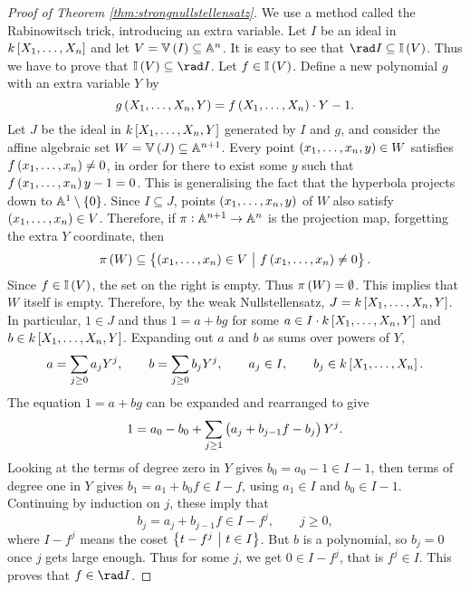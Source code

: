 \begin{proof}[Proof of Theorem \ref{thm:strongnullstellensatz}]
We use a method called the Rabinowitsch trick, introducing an extra variable. Let $ I $ be an ideal in $ k\sbr{X_1, \dots, X_n} $ and let $ V = \VV\br{I} \subseteq \AA^n $. It is easy to see that $ \rad I \subseteq \II\br{V} $. Thus we have to prove that $ \II\br{V} \subseteq \rad I $. Let $ f \in \II\br{V} $. Define a new polynomial $ g $ with an extra variable $ Y $ by
$$ g\br{X_1, \dots, X_n, Y} = f\br{X_1, \dots, X_n} \cdot Y - 1. $$
Let $ J $ be the ideal in $ k\sbr{X_1, \dots, X_n, Y} $ generated by $ I $ and $ g $, and consider the affine algebraic set $ W = \VV\br{J} \subseteq \AA^{n + 1} $. Every point $ \br{x_1, \dots, x_n, y} \in W $ satisfies $ f\br{x_1, \dots, x_n} \ne 0 $, in order for there to exist some $ y $ such that $ f\br{x_1, \dots, x_n}y - 1 = 0 $. This is generalising the fact that the hyperbola projects down to $ \AA^1 \setminus \cbr{0} $. Since $ I \subseteq J $, points $ \br{x_1, \dots, x_n, y} $ of $ W $ also satisfy $ \br{x_1, \dots, x_n} \in V $. Therefore, if $ \pi : \AA^{n + 1} \to \AA^n $ is the projection map, forgetting the extra $ Y $ coordinate, then
$$ \pi\br{W} \subseteq \cbr{\br{x_1, \dots, x_n} \in V \st f\br{x_1, \dots, x_n} \ne 0}. $$
Since $ f \in \II\br{V} $, the set on the right is empty. Thus $ \pi\br{W} = \emptyset $. This implies that $ W $ itself is empty. Therefore, by the weak Nullstellensatz, $ J = k\sbr{X_1, \dots, X_n, Y} $. In particular, $ 1 \in J $ and thus $ 1 = a + bg $ for some $ a \in I \cdot k\sbr{X_1, \dots, X_n, Y} $ and $ b \in k\sbr{X_1, \dots, X_n, Y} $. Expanding out $ a $ and $ b $ as sums over powers of $ Y $,
$$ a = \sum_{j \ge 0} a_jY^j, \qquad b = \sum_{j \ge 0} b_jY^j, \qquad a_j \in I, \qquad b_j \in k\sbr{X_1, \dots, X_n}. $$
The equation $ 1 = a + bg $ can be expanded and rearranged to give
$$ 1 = a_0 - b_0 + \sum_{j \ge 1} \br{a_j + b_{j - 1}f - b_j}Y^j. $$
Looking at the terms of degree zero in $ Y $ gives $ b_0 = a_0 - 1 \in I - 1 $, then terms of degree one in $ Y $ gives $ b_1 = a_1 + b_0f \in I - f $, using $ a_1 \in I $ and $ b_0 \in I - 1 $. Continuing by induction on $ j $, these imply that
$$ b_j = a_j + b_{j - 1}f \in I - f^j, \qquad j \ge 0, $$
where $ I - f^j $ means the coset $ \cbr{t - f^j \st t \in I} $. But $ b $ is a polynomial, so $ b_j = 0 $ once $ j $ gets large enough. Thus for some $ j $, we get $ 0 \in I - f^j $, that is $ f^j \in I $. This proves that $ f \in \rad I $.
\end{proof}

